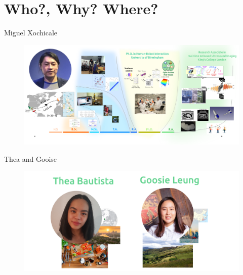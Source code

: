 \section{Who?, Why? Where?}



{
\begin{frame}{Miguel Xochicale}

  \begin{figure}
  \centering
  \includegraphics[width=1.0\textwidth]{./../figures/team/miguel-xochicale/versions/drawing-v05.png}
  \end{figure}

\end{frame}
}



{
\begin{frame}{\faUsers Thea and Gooise}

  \begin{figure}
  \centering
  \includegraphics[width=1.0\textwidth]{./../figures/team/who-we-are/versions/drawing-v12.png}
  \end{figure}

\end{frame}
}




